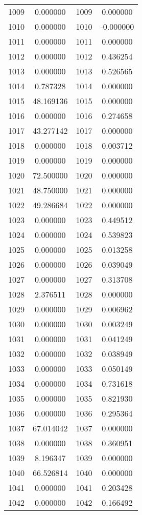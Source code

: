 \documentclass[12pt]{article}
\begin{document}
\begin{longtable}{@{}cccc@{}}
1009 & 0.000000 & 1009 & 0.000000 \\
1010 & 0.000000 & 1010 & -0.000000 \\
1011 & 0.000000 & 1011 & 0.000000 \\
1012 & 0.000000 & 1012 & 0.436254 \\
1013 & 0.000000 & 1013 & 0.526565 \\
1014 & 0.787328 & 1014 & 0.000000 \\
1015 & 48.169136 & 1015 & 0.000000 \\
1016 & 0.000000 & 1016 & 0.274658 \\
1017 & 43.277142 & 1017 & 0.000000 \\
1018 & 0.000000 & 1018 & 0.003712 \\
1019 & 0.000000 & 1019 & 0.000000 \\
1020 & 72.500000 & 1020 & 0.000000 \\
1021 & 48.750000 & 1021 & 0.000000 \\
1022 & 49.286684 & 1022 & 0.000000 \\
1023 & 0.000000 & 1023 & 0.449512 \\
1024 & 0.000000 & 1024 & 0.539823 \\
1025 & 0.000000 & 1025 & 0.013258 \\
1026 & 0.000000 & 1026 & 0.039049 \\
1027 & 0.000000 & 1027 & 0.313708 \\
1028 & 2.376511 & 1028 & 0.000000 \\
1029 & 0.000000 & 1029 & 0.006962 \\
1030 & 0.000000 & 1030 & 0.003249 \\
1031 & 0.000000 & 1031 & 0.041249 \\
1032 & 0.000000 & 1032 & 0.038949 \\
1033 & 0.000000 & 1033 & 0.050149 \\
1034 & 0.000000 & 1034 & 0.731618 \\
1035 & 0.000000 & 1035 & 0.821930 \\
1036 & 0.000000 & 1036 & 0.295364 \\
1037 & 67.014042 & 1037 & 0.000000 \\
1038 & 0.000000 & 1038 & 0.360951 \\
1039 & 8.196347 & 1039 & 0.000000 \\
1040 & 66.526814 & 1040 & 0.000000 \\
1041 & 0.000000 & 1041 & 0.203428 \\
1042 & 0.000000 & 1042 & 0.166492 \\

\end{longtable}
\end{document}
